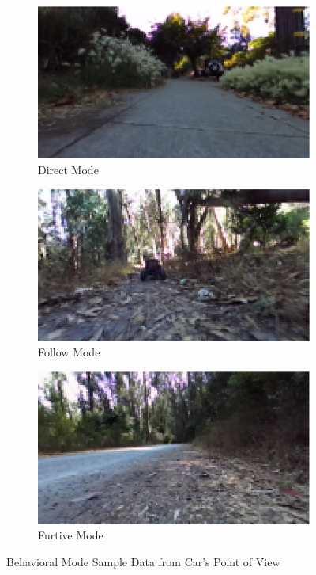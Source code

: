 {\begin{figure}[!th]
    \centering
    \begin{subfigure}{0.3\textwidth}
       \centering
       \includegraphics[width=\linewidth]{paper/content/images/directexample}
       \caption{Direct Mode}
       \label{fig1:direct}
    \end{subfigure}
    \begin{subfigure}{0.3\textwidth}
       \centering
       \includegraphics[width=\linewidth]{paper/content/images/followexample}
       \caption{Follow Mode}
       \label{fig1:follow}
    \end{subfigure}
    \begin{subfigure}{0.3\textwidth}
       \centering
       \includegraphics[width=\linewidth]{paper/content/images/furtiveexample}
       \caption{Furtive Mode}
       \label{fig1:furtive}
    \end{subfigure}
    \caption{Behavioral Mode Sample Data from Car's Point of View}
    \label{fig1:behavioralmodes}
\end{figure}
}
